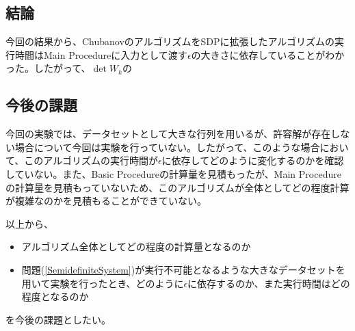\subsection{結論}
今回の結果から、ChubanovのアルゴリズムをSDPに拡張したアルゴリズムの実行時間はMain Procedureに入力として渡す$\epsilon$の大きさに依存していることがわかった。したがって、$\det W_k$の

\subsection{今後の課題}
今回の実験では、データセットとして大きな行列を用いるが、許容解が存在しない場合について今回は実験を行っていない。したがって、このような場合において、このアルゴリズムの実行時間が$\epsilon$に依存してどのように変化するのかを確認していない。また、Basic Procedureの計算量を見積もったが、Main Procedureの計算量を見積もっていないため、このアルゴリズムが全体としてどの程度計算が複雑なのかを見積もることができていない。

以上から、
\begin{itemize}
  \item アルゴリズム全体としてどの程度の計算量となるのか
  \item 問題(\ref{SemidefiniteSystem})が実行不可能となるような大きなデータセットを用いて実験を行ったとき、どのように$\epsilon$に依存するのか、また実行時間はどの程度となるのか
\end{itemize}
を今後の課題としたい。
